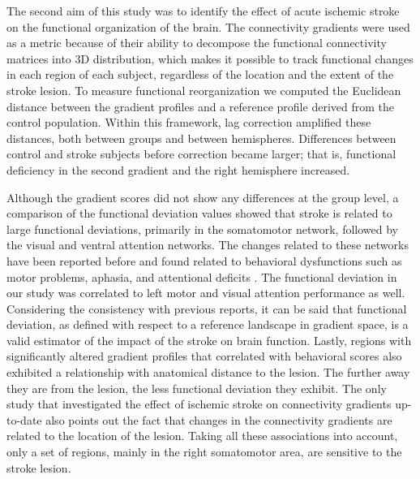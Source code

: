\documentclass[fleqn,10pt]{wlscirep}
\begin{document}
The second aim of this study was to identify the effect of acute ischemic stroke on the functional organization of the brain. The connectivity gradients were used as a metric because of their ability to decompose the functional connectivity matrices into 3D distribution, which makes it possible to track functional changes in each region of each subject, regardless of the location and the extent of the stroke lesion. To measure functional reorganization we computed the Euclidean distance between the gradient profiles and a reference profile derived from the control population. Within this framework, lag correction amplified these distances, both between groups and between hemispheres. Differences between control and stroke subjects before correction became larger; that is, functional deficiency in the second gradient and the right hemisphere increased. 

Although the gradient scores did not show any differences at the group level, a comparison of the functional deviation values showed that stroke is related to large functional deviations, primarily in the somatomotor network, followed by the visual and ventral attention networks. The changes related to these networks have been reported before and found related to behavioral dysfunctions such as motor problems, aphasia, and attentional deficits \citep{carter2010resting, corbetta2002control, siegel2016disruptions, he2007breakdown}. The functional deviation in our study was correlated to left motor and visual attention performance as well. Considering the consistency with previous reports, it can be said that functional deviation, as defined with respect to a reference landscape in gradient space, is a valid estimator of the impact of the stroke on brain function. Lastly, regions with significantly altered gradient profiles that correlated with behavioral scores also exhibited a relationship with anatomical distance to the lesion. The further away they are from the lesion, the less functional deviation they exhibit. The only study that investigated the effect of ischemic stroke on connectivity gradients up-to-date \citep{bayrak2019impact} also points out the fact that changes in the connectivity gradients are related to the location of the lesion. Taking all these associations into account, only a set of regions, mainly in the right somatomotor area, are sensitive to the stroke lesion. 
\end{document}
